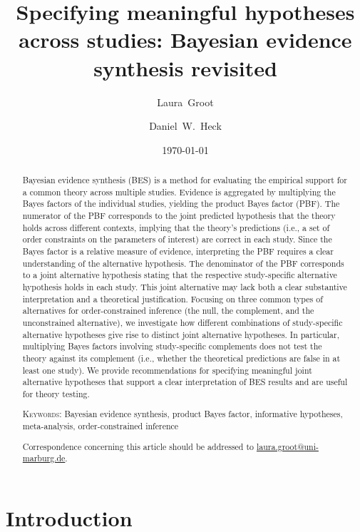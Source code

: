\documentclass[letterpaper,11pt,oneside]{article}
\title{
    \vspace{-3em}
    \textsf{\textbf{
        Specifying meaningful hypotheses across studies: Bayesian evidence synthesis revisited
    }}
}
\author[1]{
    Laura~Groot \orcidlink{0009-0000-6989-0468}
}
\author[1]{
    Daniel~W.~Heck \orcidlink{0000-0002-6302-9252}
}
\affil[1]{
    Psychological Methods Lab, Department of Psychology, Philipps-Universität Marburg
}
\date{\today}
\begin{document}
\maketitle

\begin{abstract} %

\noindent
Bayesian evidence synthesis (BES) is a method for evaluating the empirical support for a common theory across multiple studies. Evidence is aggregated by multiplying the Bayes factors of the individual studies, yielding the product Bayes factor (PBF). The numerator of the PBF corresponds to the joint predicted hypothesis that the theory holds across different contexts, implying that the theory's predictions (i.e., a set of order constraints on the parameters of interest) are correct in each study. Since the Bayes factor is a relative measure of evidence, interpreting the PBF requires a clear understanding of the alternative hypothesis. The denominator of the PBF corresponds to a joint alternative hypothesis stating that the respective study-specific alternative hypothesis holds in each study. This joint alternative may lack both a clear substantive interpretation and a theoretical justification. Focusing on three common types of alternatives for order-constrained inference (the null, the complement, and the unconstrained alternative), we investigate how different combinations of study-specific alternative hypotheses give rise to distinct joint alternative hypotheses. In particular, multiplying Bayes factors involving study-specific complements does not test the theory against its complement (i.e., whether the theoretical predictions are false in at least one study).
We provide recommendations for specifying meaningful joint alternative hypotheses that support a clear interpretation of BES results and are useful for theory testing.

\noindent
\textsc{Keywords}: Bayesian evidence synthesis, product Bayes factor, informative hypotheses, meta-analysis, order-constrained inference

\vfill

\noindent
Correspondence concerning this article should be addressed to 
\url{laura.groot@uni-marburg.de}.

\end{abstract}

\newpage

\section{Introduction}
\end{document}
